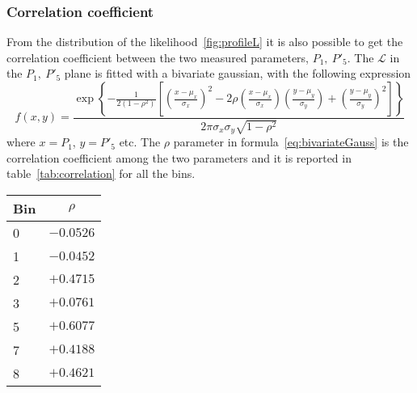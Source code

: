 \clearpage
\subsubsection{Correlation coefficient}

From the distribution of the likelihood~\ref{fig:profileL} it is also possible to get the correlation coefficient between the two measured parameters, $P_1,~P'_5$.
The $\mathcal{L}$ in the $P_1,~P'_5$ plane is fitted with a bivariate gaussian, with the following expression
\begin{equation}\label{eq:bivariateGauss}
  f(x,y)=\frac{\exp \left\{ -\frac 1{2(1-\rho ^2)}\left[ \left( \frac{x-\mu _x%
      }{\sigma _x}\right) ^2-2\rho \left( \frac{x-\mu _x}{\sigma _x}\right) \left( 
      \frac{y-\mu _y}{\sigma _y}\right) +\left( \frac{y-\mu _y}{\sigma _y}\right)
      ^2\right] \right\} }{2\pi \sigma _x\sigma _y\sqrt{1-\rho ^2}} 
\end{equation}
where $x=P_1$, $y=P'_5$ etc. The $\rho$ parameter in formula~\ref{eq:bivariateGauss} is the correlation coefficient among the two parameters and it is reported in table~\ref{tab:correlation} for all the bins.

\begin{table*}[!htb]

  \begin{center}
    \caption{Correlation coefficient between $P_1$ and $P'_5$ in different $q^2$ bins.}\label{tab:correlation}

    \begin{tabular}{l|c}
      Bin  & $\rho$ \\ 
      \hline
      \hline
      0 &  $-0.0526$  \\
      1 &  $-0.0452$  \\
      2 &  $+0.4715$  \\
      3 &  $+0.0761$  \\
      5 &  $+0.6077$  \\
      7 &  $+0.4188$  \\
      8 &  $+0.4621$  \\

    \end{tabular}
  \end{center}
\end{table*}

